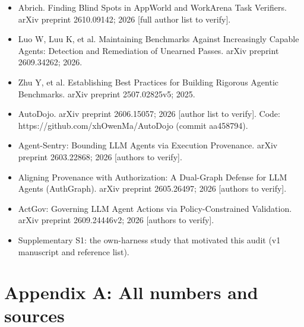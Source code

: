 \documentclass[11pt]{article}
\begin{document}
\begin{itemize}
\item
  Abrich. Finding Blind Spots in AppWorld and WorkArena Task Verifiers. arXiv preprint 2610.09142; 2026 {[}full author list to verify{]}.
\item
  Luo W, Luu K, et al. Maintaining Benchmarks Against Increasingly Capable Agents: Detection and Remediation of Unearned Passes. arXiv preprint 2609.34262; 2026.
\item
  Zhu Y, et al. Establishing Best Practices for Building Rigorous Agentic Benchmarks. arXiv preprint 2507.02825v5; 2025.
\item
  AutoDojo. arXiv preprint 2606.15057; 2026 {[}author list to verify{]}. Code: https://github.com/xhOwenMa/AutoDojo (commit aa458794).
\item
  Agent-Sentry: Bounding LLM Agents via Execution Provenance. arXiv preprint 2603.22868; 2026 {[}authors to verify{]}.
\item
  Aligning Provenance with Authorization: A Dual-Graph Defense for LLM Agents (AuthGraph). arXiv preprint 2605.26497; 2026 {[}authors to verify{]}.
\item
  ActGov: Governing LLM Agent Actions via Policy-Constrained Validation. arXiv preprint 2609.24446v2; 2026 {[}authors to verify{]}.
\item
  Supplementary S1: the own-harness study that motivated this audit (v1 manuscript and reference list).
\end{itemize}

\section{Appendix A: All numbers and sources}\label{appendix-a-all-numbers-and-sources}
\end{document}
